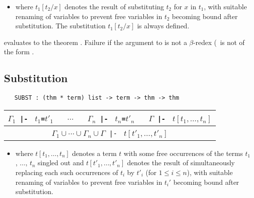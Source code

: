 \begin{itemize}
\item where $t_1[t_2/x]$ denotes the result of substituting $t_2$ for $x$
in $t_1$, with suitable renaming of variables to prevent free variables
in $t_2$ becoming bound after substitution. The substitution
 $t_1[t_2/x]$ is always defined.
\end{itemize}

\noindent {} %
evaluates to the theorem .
Failure if the argument to  is not a $\beta$-redex
(\ie\ is not of the form .

\bigskip

\subsection{Substitution}

\begin{holboxed}
\begin{verbatim}
   SUBST : (thm * term) list -> term -> thm -> thm
\end{verbatim}\end{holboxed}

\begin{center}
\begin{tabular}{c}
$\Gamma_1${\small\verb+ |- +} $t_1${\small\verb+=+}$t'_1$ {\small\verb+  +} $\cdots$ {\small\verb+  +}
$\Gamma_n${\small\verb+ |- +} $t_n${\small\verb+=+}$t'_n$ {\small\verb+  +}
$\Gamma${\small\verb+ |- +} $t[t_1,\ldots,t_n]$ \\ \hline
$\Gamma_1 \cup \cdots
\cup \Gamma_n \cup \Gamma${\small\verb+ |- +} $t[t'_1,\ldots,t'_n]$ \\
\end{tabular}
\end{center}

\bigskip

\begin{itemize}
\item where $t[t_1,\ldots,t_n]$ denotes a term $t$ with some free
occurrences of the terms $t_1$, $\dots$, $t_n$ singled out and
$t[t'_1,\ldots,t'_n]$ denotes the result of simultaneously replacing each
such occurrences of $t_i$ by $t'_i$ (for $1{\leq}i {\leq} n$),
with suitable renaming of variables to prevent free variables
in $t_i'$ becoming bound after substitution.
\end{itemize}

